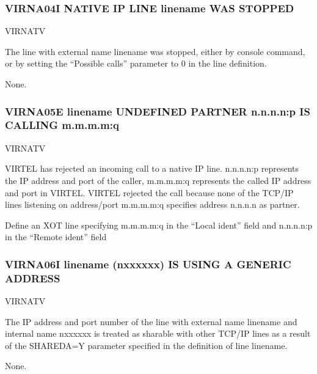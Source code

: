 \documentclass[letterpaper,10pt,english]{sphinxmanual}
\begin{document}
\subsubsection{VIRNA04I NATIVE IP LINE linename WAS STOPPED}
\label{\detokenize{messages:virna04i-native-ip-line-linename-was-stopped}}\begin{description}
\sphinxAtStartPar
VIRNATV

\sphinxAtStartPar
The line with external name linename was stopped, either by console command, or by setting the “Possible calls” parameter to 0 in the line definition.

\sphinxAtStartPar
None.

\end{description}


\subsubsection{VIRNA05E linename UNDEFINED PARTNER n.n.n.n:p IS CALLING m.m.m.m:q}
\label{\detokenize{messages:virna05e-linename-undefined-partner-n-n-n-n-p-is-calling-m-m-m-m-q}}\begin{description}
\sphinxAtStartPar
VIRNATV

\sphinxAtStartPar
VIRTEL has rejected an incoming call to a native IP line. n.n.n.n:p represents the IP address and port of the caller, m.m.m.m:q represents the called IP address and port in VIRTEL. VIRTEL rejected the call because none of the TCP/IP lines listening on address/port m.m.m.m:q specifies address n.n.n.n as partner.

\sphinxAtStartPar
Define an XOT line specifying m.m.m.m:q in the “Local ident” field and n.n.n.n:p in the “Remote ident” field

\end{description}


\subsubsection{VIRNA06I linename (n\sphinxhyphen{}xxxxxx) IS USING A GENERIC ADDRESS}
\label{\detokenize{messages:virna06i-linename-n-xxxxxx-is-using-a-generic-address}}\begin{description}
\sphinxAtStartPar
VIRNATV

\sphinxAtStartPar
The IP address and port number of the line with external name linename and internal name n\sphinxhyphen{}xxxxxx is treated as sharable with other TCP/IP lines as a result of the SHAREDA=Y parameter specified in the definition of line linename.

\sphinxAtStartPar
None.

\end{description}
\end{document}
